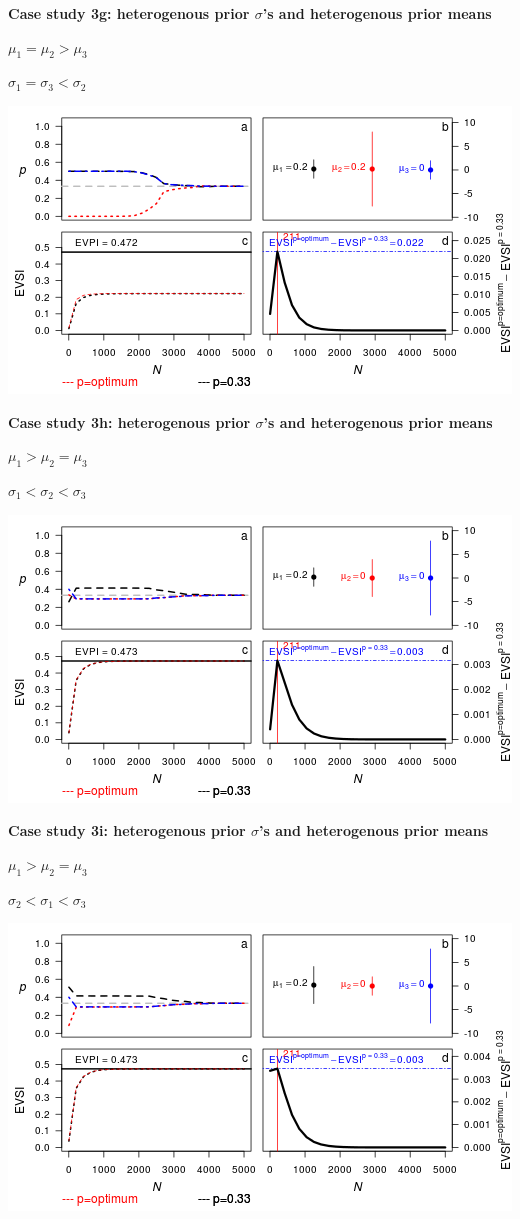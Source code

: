 \textbf{Case study 3g: heterogenous prior \(\sigma\)'s and heterogenous
prior means}

\(\mu_1 = \mu_2 > \mu_3\)

\(\sigma_1 = \sigma_3 < \sigma_2\)

\includegraphics{figure/x110_1__1_1c-1.png} \clearpage

\textbf{Case study 3h: heterogenous prior \(\sigma\)'s and heterogenous
prior means}

\(\mu_1 > \mu_2 = \mu_3\)

\(\sigma_1 < \sigma_2 < \sigma_3\)

\includegraphics{figure/x100_1__1___1c-1.png} \clearpage  

\textbf{Case study 3i: heterogenous prior \(\sigma\)'s and heterogenous
prior means}

\(\mu_1 > \mu_2 = \mu_3\)

\(\sigma_2 < \sigma_1 < \sigma_3\)

\includegraphics{figure/x100__1_1___1c-1.png} \clearpage

